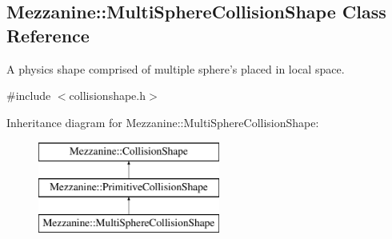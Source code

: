 \hypertarget{classMezzanine_1_1MultiSphereCollisionShape}{
\subsection{Mezzanine::MultiSphereCollisionShape Class Reference}
\label{classMezzanine_1_1MultiSphereCollisionShape}
}


A physics shape comprised of multiple sphere's placed in local space.  




{\ttfamily \#include $<$collisionshape.h$>$}

Inheritance diagram for Mezzanine::MultiSphereCollisionShape:\begin{figure}[H]
\begin{center}
\leavevmode
\includegraphics[height=3.000000cm]{classMezzanine_1_1MultiSphereCollisionShape}
\end{center}
\end{figure}

